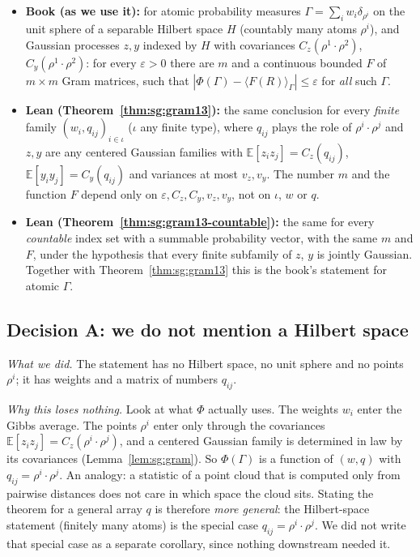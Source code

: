 \begin{itemize}
\item \textbf{Book (as we use it):} for atomic probability measures $\Gamma=\sum_{i}w_i\delta_{\rho^i}$ on the unit sphere of a separable Hilbert space $H$ (countably many atoms $\rho^i$), and Gaussian processes
$z,y$ indexed by $H$ with covariances $C_z(\rho^1\cdot\rho^2)$, $C_y(\rho^1\cdot\rho^2)$: for every $\varepsilon>0$ there are $m$ and a continuous bounded $F$ of $m\times m$ Gram matrices, such that
$|\Phi(\Gamma)-\langle F(R)\rangle_\Gamma|\le\varepsilon$ for \emph{all} such $\Gamma$.
\item \textbf{Lean (Theorem~\ref{thm:sg:gram13}):} the same conclusion for every \emph{finite} family $(w_i,q_{ij})_{i\in\iota}$ ($\iota$ any finite type), where $q_{ij}$ plays the role of $\rho^i\cdot\rho^j$ and
$z,y$ are any centered Gaussian families with $\mathbb E[z_iz_j]=C_z(q_{ij})$, $\mathbb E[y_iy_j]=C_y(q_{ij})$ and variances at most $v_z,v_y$. The number $m$ and the function $F$ depend only on $\varepsilon,C_z,C_y,v_z,v_y$,
not on $\iota$, $w$ or $q$.
\item \textbf{Lean (Theorem~\ref{thm:sg:gram13-countable}):} the same for every \emph{countable} index set with a summable probability vector, with the same $m$ and $F$, under the hypothesis that every finite subfamily of $z$, $y$ is jointly Gaussian. Together with Theorem~\ref{thm:sg:gram13} this is the book's statement for atomic $\Gamma$.
\end{itemize}

\subsection*{Decision A: we do not mention a Hilbert space}

\emph{What we did.} The statement has no Hilbert space, no unit sphere and no points $\rho^i$; it has weights and a matrix of numbers $q_{ij}$.

\emph{Why this loses nothing.} Look at what $\Phi$ actually uses. The weights $w_i$ enter the Gibbs average. The points $\rho^i$ enter only through the covariances $\mathbb E[z_iz_j]=C_z(\rho^i\cdot\rho^j)$, and a centered Gaussian family
is determined in law by its covariances (Lemma~\ref{lem:sg:gram}). So $\Phi(\Gamma)$ is a function of $(w,q)$ with $q_{ij}=\rho^i\cdot\rho^j$. An analogy: a statistic of a point cloud that is computed only from pairwise distances does not care
in which space the cloud sits. Stating the theorem for a general array $q$ is therefore \emph{more general}: the Hilbert-space statement (finitely many atoms) is the special case $q_{ij}=\rho^i\cdot\rho^j$. We did not write that special case
as a separate corollary, since nothing downstream needed it.

